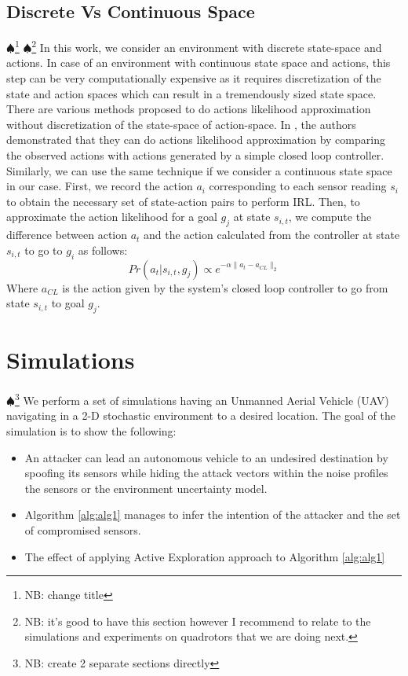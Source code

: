 \documentclass[letterpaper, 10 pt, conference]{ieeeconf}  %
\newcommand\NB[1]{$\spadesuit$\footnote{NB: #1}}
\begin{document}
\subsection{Discrete Vs Continuous Space}\NB{change title}
\NB{it's good to have this section however I recommend to relate to the simulations and experiments on quadrotors that we are doing next.} In this work, we consider an  environment with discrete state-space and actions. In case of an environment with continuous state space and actions, this step can be very computationally expensive as it requires discretization of the state and action spaces which can result in a tremendously sized state space. There are various methods proposed to do actions likelihood approximation without discretization of the state-space of action-space. In \cite{Michini2013}, the authors demonstrated that they can do actions likelihood approximation by comparing the observed actions with actions generated by a simple closed loop controller. Similarly, we can use the same technique if we consider a continuous state space in our case. First, we record the action $a_i$ corresponding to each sensor reading $s_i$ to obtain the necessary set of state-action pairs to perform IRL. Then, to approximate the action likelihood for a goal $g_j$ at state $s_{i,t}$, we compute the difference between action $a_t$ and the action calculated from the controller at state $s_{i,t}$ to go to $g_i$ as follows:
\begin{equation}
 Pr(a_t|s_{i,t},g_j) \propto e^{-\alpha \lVert a_t - a_{CL} \rVert_{2}}
\end{equation}
Where $a_{CL}$ is the action given by the system's closed loop controller to go from state $s_{i,t}$ to goal $g_j$.
\section{Simulations}\label{sec:simulations} \NB{create 2 separate sections directly}
We perform a set of simulations having an Unmanned Aerial Vehicle (UAV) navigating in a 2-D stochastic environment to a desired location. The goal of the simulation is to show the following:
\begin{itemize}
    \item An attacker can lead an autonomous vehicle to an undesired destination by spoofing its sensors while hiding the attack vectors within the noise profiles the sensors or the environment uncertainty model.
    \item Algorithm \ref{alg:alg1} manages to infer the intention of the attacker and the set of compromised sensors.
    \item The effect of applying Active Exploration approach to Algorithm \ref{alg:alg1}
\end{itemize}
\end{document}
